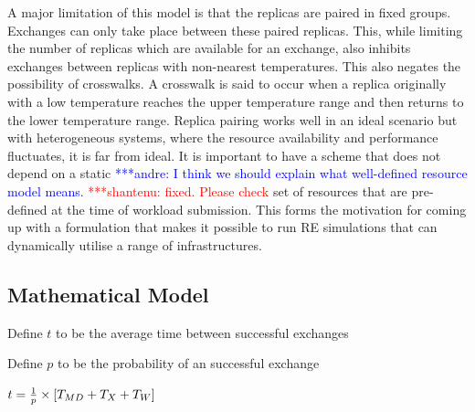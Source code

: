 \documentclass{rspublic}
\newcommand{\jhanote}[1]{ {\textcolor{red} { ***shantenu: #1 }}}
\newcommand{\alnote}[1]{ {\textcolor{blue} { ***andre: #1 }}}
\newcommand{\alnote}[1]{}
\newcommand{\jhanote}[1]{}
\begin{document}
A major limitation of this model is that the replicas are paired in fixed groups. 
Exchanges can only take place between these paired replicas.
This, while limiting the number of replicas which are available for an exchange, also inhibits exchanges between replicas with non-nearest temperatures. This also negates the possibility of crosswalks. A crosswalk is said to occur when a replica originally with a low temperature reaches the upper temperature range and then returns to the lower temperature range. %
Replica pairing works well in an ideal scenario but with heterogeneous
systems, where the resource availability and performance fluctuates,
it is far from ideal. It is important to have a scheme that does not
depend on a static \alnote{I think we should explain what well-defined
  resource model means.} \jhanote{fixed. Please check} set of
resources that are pre-defined at the time of workload submission.
This forms the motivation for coming up with a formulation that makes
it possible to run RE simulations that can dynamically utilise a range
of infrastructures.
  

\subsection{Mathematical Model}

Define $t$ to be the average time between successful exchanges

Define $p$ to be the probability of an successful exchange

$t=  {1 \over p} \times {[T_{MD} + T_{X} + T_{W}]} $
\end{document}
